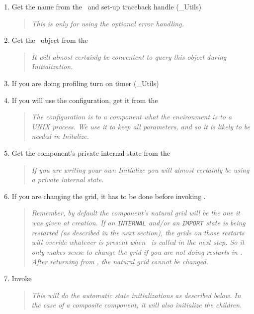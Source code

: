 \begin{enumerate}
\item Get the name from the \egc\  and set-up traceback handle (\ggn _Utils)
\begin{quote}
{\em This is only for using the optional error handling.}
\end{quote}

\item Get the \ggn\  object from the \egc
\begin{quote} 
{\em It will almost certainly be convenient to query
    this object during Initialization.}
\end{quote}

\item If you are doing profiling turn on timer  (\ggn _Utils)


\item If you will use the configuration, get it from the \egc
\begin{quote} {\em The configuration is to a component what the
    environment is to a UNIX process. We use it to keep all
    parameters, and so it is likely to be needed in Initalize.}
\end{quote}

\item Get the component's private internal state from the \egc
\begin{quote} {\em If you are writing your own Initialize you will
    almost certainly be using a private internal state.}
\end{quote}


\item If you are changing the grid, it has to be done before invoking
  \gint.
\begin{quote} {\em Remember, by default the component's natural grid
  will be the one it was given at creation. If an {\tt INTERNAL}
  and/or an {\tt IMPORT} state is being restarted (as described in the
  next section), the grids on those restarts will overide whatever is
  present when \gint\  is called in the next step. So it only makes
  sense to change the grid if you are {\em not} doing restarts in
  \gint. After returning from \gint, the natural grid cannot be changed.}
    \end{quote}

\item Invoke \gint
\begin{quote} {\em This will do the automatic state initializations as
  described below. In the case of a composite component, it will also
  initialize the children.}
    \end{quote}


\end{enumerate}
